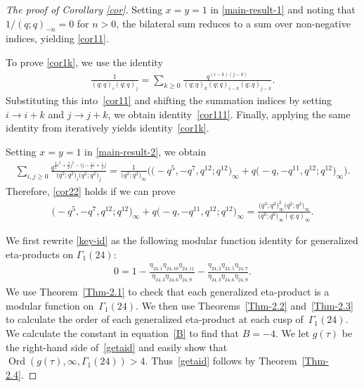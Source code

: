 \documentclass[10pt,a4paper]{amsart}
\numberwithin{equation}{section}
\theoremstyle{definition}
\begin{document}
\begin{proof}[The proof of Corollary \ref{cor}]
Setting $x=y=1$ in \eqref{main-result-1} and noting that $1/(q;q)_{-n}=0$ for $n>0$, the bilateral sum reduces to a sum over non-negative indices, yielding \eqref{cor11}.

To prove \eqref{cor1k}, we use the identity \cite[p.~20]{Andrews-1981}
\begin{align*}
\frac{1}{(q;q)_i(q;q)_j}=\sum_{k\geq0}\frac{q^{(i-k)(j-k)}}{(q;q)_k(q;q)_{i-k}(q;q)_{j-k}}.
\end{align*}
Substituting this into~\eqref{cor11} and shifting the summation indices by setting $i\rightarrow i+k$ and $j\rightarrow j+k$, we obtain identity~\eqref{cor111}. Finally, applying the same identity from \cite[p.~20]{Andrews-1981} iteratively yields identity~\eqref{cor1k}.

Setting $x=y=1$ in \eqref{main-result-2}, we obtain
\begin{align*}
\sum_{i,j\geq0}\frac{q^{\frac{3}{2}i^2+\frac{3}{2}j^2-ij-\frac{1}{2}i+\frac{1}{2}j}} {\bigl(q^2;q^2\bigr)_i\bigl(q^2;q^2\bigr)_j}=\frac{1}{\bigl(q^2;q^2\bigr)_{\infty}}
\bigl(\bigl(-q^5,-q^7,q^{12};q^{12}\bigr)_{\infty}+q\bigl(-q,-q^{11},q^{12};q^{12}\bigr)_{\infty}\bigr).
\end{align*}
Therefore, \eqref{cor22} holds if we can prove
\begin{align}\label{key-id}
\bigl(-q^5,-q^7,q^{12};q^{12}\bigr)_{\infty}+q\bigl(-q,-q^{11},q^{12};q^{12}\bigr)_{\infty}
=\frac{\bigl(q^3;q^3\bigr)^2_{\infty}\bigl(q^2;q^2\bigr)_{\infty}}{\bigl(q^6;q^6\bigr)_{\infty}(q;q)_{\infty}}.
\end{align}

We first rewrite \eqref{key-id} as the following modular function identity for generalized eta-products on $\Gamma_1(24)$:
\begin{align}\label{getaid}
0=1-\frac{\eta_{24,1}\eta_{24,10}\eta_{24,11}}{\eta_{24,3}\eta_{24,6}\eta_{24,9}}-\frac{\eta_{24,2}\eta_{24,5}\eta_{24,7}}{\eta_{24,3}\eta_{24,6}\eta_{24,9}}.
\end{align}
We use Theorem~\ref{Thm-2.1} to check that each generalized eta-product is a modular function on~$\Gamma_1(24)$. We then use Theorems~\ref{Thm-2.2} and~\ref{Thm-2.3} to calculate the order of each generalized eta-product at each cusp of~$\Gamma_1(24)$. We calculate the constant in equation~\eqref{B} to find that $B=-4$. We let $g(\tau)$ be the right-hand side of~\eqref{getaid} and easily show that $\operatorname{Ord}(g(\tau),\infty,\Gamma_1(24)) > 4$. Thus~\eqref{getaid} follows by Theorem~\ref{Thm-2.4}.


\end{proof}
\end{document}
